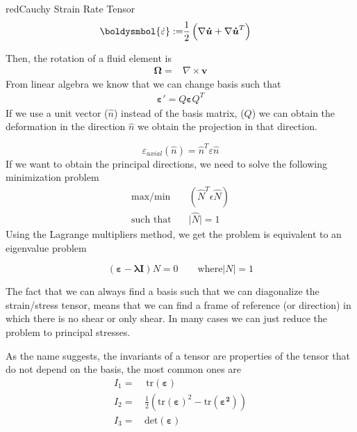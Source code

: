 \documentclass[a4paper, 11pt,article,oneside]{memoir}%
\begin{document}
\begin{eqbox2}{red}{Cauchy Strain Rate Tensor}
\begin{align*}
\boldysmbol{\dot{\varepsilon}}:=&\dfrac{1}{2}\left(\nabla\boldsymbol{\dot{u}}+\nabla\boldsymbol{\dot{u}}^T \right)
\end{align*}
\end{eqbox2}
Then, the rotation of a fluid element is 
\begin{align*}
\boldsymbol{\Omega}=&\nabla \times \boldsymbol{v}
\end{align*}
From linear algebra we know that we can change basis such that
\begin{align*}
\boldsymbol{\varepsilon}'=Q\boldsymbol{\varepsilon}Q^T
\end{align*} 
If we use a unit vector ($\hat{n}$) instead of the basis matrix, ($Q$) we can obtain the deformation in the direction $\hat{n}$ we obtain the projection in that direction.

\begin{equation*}
\varepsilon_{axial}(\hat{n})=\hat{n}^T\varepsilon\hat{n}
\end{equation*}
If we want to obtain the principal directions, we need to solve the following minimization problem 
\begin{align*}
\text{max/min}\quad& (\hat{N}^T\epsilon\hat{N})\\
\text{such that}\quad& \vert\hat{N}\vert=1
\end{align*}
Using the Lagrange multipliers method, we get the problem is equivalent to an eigenvalue problem
\begin{eqbox}
\begin{equation*}
\left(\boldsymbol{\varepsilon-\lambda I} \right)N=0 \qquad \text{where} \vert N\vert=1
\end{equation*}
\end{eqbox}
\begin{note}
The fact that we can always find a basis such that we can diagonalize the strain/stress tensor, means that we can find a frame of reference (or direction) in which there is no shear or only shear. In many cases we can just reduce the problem to principal stresses.
\end{note}
As the name suggests, the invariants of a tensor are properties of the tensor that do not depend on the basis, the most common ones are
\begin{align*}
I_1 =&\,\text{tr}(\boldsymbol{\varepsilon})\\
I_2=\, &\frac{1}{2}\left(\text{tr}(\boldsymbol{\varepsilon})^2-\text{tr}(\boldsymbol{\varepsilon^2})\right)\\
I_3=\, &\text{det}(\boldsymbol{\varepsilon})
\end{align*}
\end{document}
